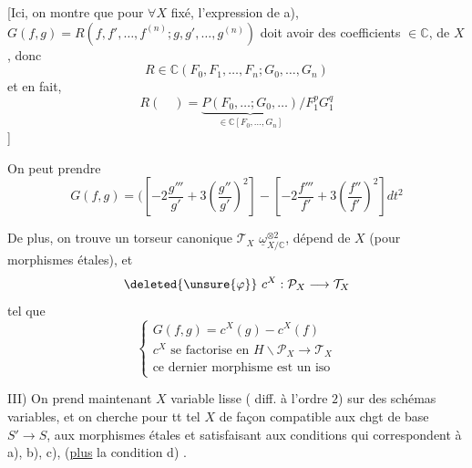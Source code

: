 [Ici, on montre que 
pour $\forall X$ fixé, l'expression de a),
$G(f,g)=R(f,f',\ldots,f^{(n)};g,g',\ldots,g^{(n)})$ doit avoir
des coefficients $\in\mathbb{C}$,  de $X$, donc
\[
R\in\mathbb{C}(F_0,F_1,\ldots,F_n;G_0,\ldots,G_n)
\]
et en fait,
\[
R(\quad)=
\underbrace{P(F_0,\ldots;G_0,\ldots)}_{\in\mathbb{C}[F_0,\ldots,G_n]}
/F_1^pG_1^q
\]
]

On peut prendre
\[
G(f,g)=\bigl(
\left[-2\frac{g'''}{g'}+3\left(\frac{g''}{g'}\right)^2\right]
-\left[-2\frac{f'''}{f'}+3\left(\frac{f''}{f'}\right)^2\right]
dt^2
\]

De plus, on trouve un torseur canonique $\mathcal{T}_X$ 
$\underline{\omega}_{X/\mathbb{C}}^{\otimes2}$,
dépend  de $X$ (pour morphismes
étales), et
\[
\deleted{\unsure{\varphi}}\ c^X:\mathcal{P}_X\longrightarrow\mathcal{T}_X
\]
tel que
\[
\left\{\begin{array}{l}
G(f,g)=c^X(g)-c^X(f)\\
c^X\text{ se factorise en }H\backslash\mathcal{P}_X\longrightarrow\mathcal{T}_X\\
\text{ce dernier morphisme est un iso}
\end{array}\right.
\]

III) On prend maintenant $X$  variable lisse
(  diff.  à l'ordre $2$)
sur des schémas variables, et on cherche pour tt tel $X$
de façon compatible aux chgt de base $S'\longrightarrow S$,
aux morphismes étales
et satisfaisant aux conditions qui correspondent à a), b), c),
(\uline{plus} la condition d) 
.


